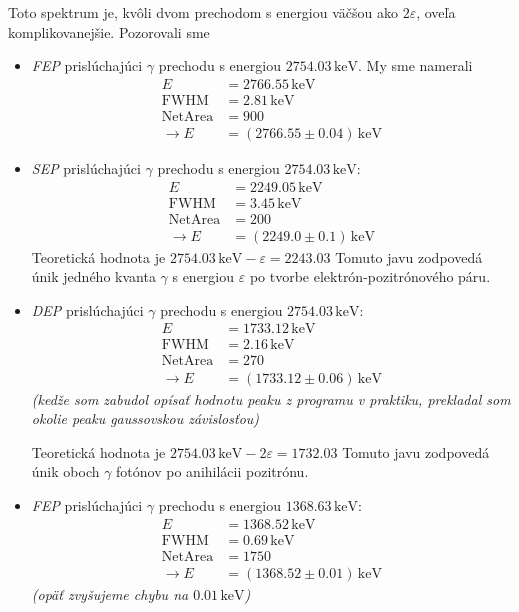 \documentclass[a4paper, 10pt]{article}
\newcommand{\unit}[1]{\ensuremath{\, \mathrm{#1}}}
\begin{document}
Toto spektrum je, kvôli dvom prechodom s energiou väčšou ako $2\varepsilon$, oveľa komplikovanejšie. Pozorovali sme
\begin{itemize}
\item \textit{FEP} prislúchajúci $\gamma$ prechodu s energiou $2754.03\unit{keV}$. My sme namerali 
\begin{align*}
E &= 2766.55\unit{keV}\\
\mathrm{FWHM} &= 2.81\unit{keV}\\
\mathrm{Net Area} &= 900\\
\rightarrow E &= (2766.55\pm 0.04)\unit {keV}
\end{align*}

\item \textit{SEP} prislúchajúci $\gamma$ prechodu s energiou $2754.03\unit{keV}$:
\begin{align*}
E &= 2249.05\unit{keV}\\
\mathrm{FWHM} &= 3.45\unit{keV}\\
\mathrm{Net Area} &= 200\\
\rightarrow E &= (2249.0\pm 0.1)\unit {keV}
\end{align*}
Teoretická hodnota je $2754.03\unit{keV}-\varepsilon = 2243.03$
Tomuto javu zodpovedá únik jedného kvanta $\gamma$ s energiou $\varepsilon$ po tvorbe elektrón-pozitrónového páru.

\item \textit{DEP} prislúchajúci $\gamma$ prechodu s energiou $2754.03\unit{keV}$:
\begin{align*}
E &= 1733.12\unit{keV}\\
\mathrm{FWHM} &= 2.16\unit{keV}\\
\mathrm{Net Area} &= 270\\
\rightarrow E &= (1733.12\pm 0.06)\unit {keV}
\end{align*}
\textit{(kedže som zabudol opísať hodnotu peaku z programu v praktiku, prekladal som okolie peaku gaussovskou závislosťou)}

Teoretická hodnota je $2754.03\unit{keV}-2\varepsilon = 1732.03$
Tomuto javu zodpovedá únik oboch $\gamma$ fotónov po anihilácii pozitrónu.

\item \textit{FEP} prislúchajúci $\gamma$ prechodu s energiou $1368.63\unit{keV}$:
\begin{align*}
E &= 1368.52\unit{keV}\\
\mathrm{FWHM} &= 0.69\unit{keV}\\
\mathrm{Net Area} &= 1750\\
\rightarrow E &= (1368.52\pm 0.01)\unit {keV}
\end{align*}
\textit{(opäť zvyšujeme chybu na $0.01\unit{keV}$)}


\end{itemize}
\end{document}
